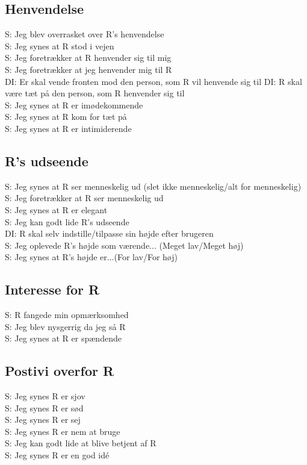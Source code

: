 \subsection{Henvendelse}
%
S: Jeg blev overrasket over R's henvendelse\\
S: Jeg synes at R stod i vejen\\
S: Jeg foretrækker at R henvender sig til mig\\
S: Jeg foretrækker at jeg henvender mig til R\\
DI: Er skal vende fronten mod den person, som R vil henvende sig til
DI: R skal være tæt på den person, som R henvender sig til\\
S: Jeg synes at R er imødekommende\\
S: Jeg synes at R kom for tæt på\\
S: Jeg synes at R er intimiderende\\

\subsection{R's udseende}
%
S: Jeg synes at R ser menneskelig ud (slet ikke menneskelig/alt for menneskelig)\\
S: Jeg foretrækker at R ser menneskelig ud\\
S: Jeg synes at R er elegant\\
S: Jeg kan godt lide R's udseende\\
DI: R skal selv indstille/tilpasse sin højde efter brugeren\\
S: Jeg oplevede R's højde som værende... (Meget lav/Meget høj)\\
S: Jeg synes at R's højde er...(For lav/For høj)\\

\subsection{Interesse for R}
%
S: R fangede min opmærksomhed\\
S: Jeg blev nysgerrig da jeg så R\\
S: Jeg synes at R er spændende\\


\subsection{Postivi overfor R}
%
S: Jeg synes R er sjov\\
S: Jeg synes R er sød\\
S: Jeg synes R er sej\\
S: Jeg synes R er nem at bruge\\
S: Jeg kan godt lide at blive betjent af R\\
S: Jeg synes R er en god idé

